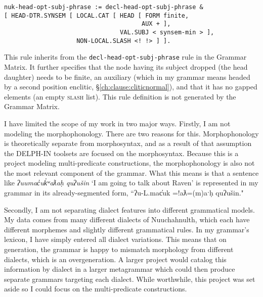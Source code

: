 \begin{verbatim}
nuk-head-opt-subj-phrase := decl-head-opt-subj-phrase &
[ HEAD-DTR.SYNSEM [ LOCAL.CAT [ HEAD [ FORM finite,
                                      AUX + ],
                                VAL.SUBJ < synsem-min > ],
                    NON-LOCAL.SLASH <! !> ] ].
\end{verbatim}

\noindent This rule inherits from the \texttt{decl-head-opt-subj-phrase} rule in the Grammar Matrix. It further specifies that the node having its subject dropped (the head daughter) needs to be finite, an auxiliary (which in my grammar means headed by a second position enclitic, \S\ref{ch:clause:cliticnormal}), and that it has no gapped elements (an empty \textsc{slash} list). This rule definition is not generated by the Grammar Matrix.

I have limited the scope of my work in two major ways. Firstly, I am not modeling the morphophonology. There are two reasons for this. Morphophonology is theoretically separate from morphosyntax, and as a result of that assumption the DELPH-IN toolsets are focused on the morphosyntax. Because this is a project modeling multi-predicate constructions, the morphophonology is also not the most relevant component of the grammar. What this means is that a sentence like \textit{ʔuumac̓uk̓ʷaƛaḥ quʔušin} `I am going to talk about Raven' is represented in my grammar in its already-segmented form, ``ʔu-L.mac̓uk =!aƛ=(m)aˑḥ quʔušin."

Secondly, I am not separating dialect features into different grammatical models. My data comes from many different dialects of Nuuchahnulth, which each have different morphemes and slightly different grammatical rules. In my grammar's lexicon, I have simply entered all dialect variations. This means that on generation, the grammar is happy to mismatch morphology from different dialects, which is an overgeneration. A larger project would catalog this information by dialect in a larger metagrammar which could then produce separate grammars targeting each dialect. While worthwhile, this project was set aside so I could focus on the multi-predicate constructions.

